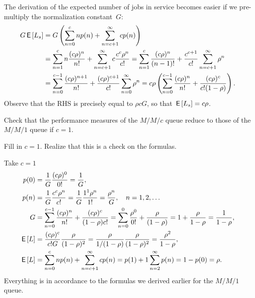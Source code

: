 \documentclass[queueing-book.tex]{subfiles}
\begin{document}
\begin{exercise}
\begin{solution}
The derivation of the expected number of jobs in service becomes easier if we pre-multiply the normalization constant~$G$:
 \begin{align*}
 G \,\mathsf{E}\left[L_s\right]
&= G \left( \sum_{n=0}^{c} n p(n) + \sum_{n=c+1}^{\infty} c p(n) \right) \\
&= \sum_{n=1}^{c} n \frac{(c\rho)^n}{n!} + \sum_{n=c+1}^{\infty} c \frac{c^c\rho^n}{c!}
= \sum_{n=1}^{c} \frac{(c\rho)^n}{(n-1)!} + \frac{c^{c+1}}{c!}\sum_{n=c+1}^{\infty} \rho^n\\
&= \sum_{n=0}^{c-1} \frac{(c\rho)^{n+1}}{n!} + \frac{(c\rho)^{c+1}}{c!}\sum_{n=0}^{\infty} \rho^n
= c\rho \left(\sum_{n=0}^{c-1} \frac{(c\rho)^n}{n!} + \frac{(c\rho)^{c}}{c!(1-\rho)}\right).
 \end{align*}
Observe that the RHS is precisely equal to $\rho c G$, so that $\,\mathsf{E}\left[L_s\right] = c \rho$.
\end{solution}
\end{exercise}






\begin{exercise}
 Check that the performance measures of the $M/M/c$ queue reduce to those of the $M/M/1$ queue if $c=1$.
\begin{hint}
Fill in $c=1$. Realize that this is a check on the formulas.
\end{hint}
\begin{solution}
Take $c=1$
 \begin{align*}
p(0) &= \frac{1}G \frac{(c\rho)^0}{0!}=\frac1 G, \\
p(n) &= \frac{1}G \frac{c^c\rho^n}{c!} = \frac{1}G \frac{1^1\rho^n}{1!} =\frac{\rho^n}G , \quad n=1,2, \ldots \\
G &=\sum_{n=0}^{c-1} \frac{(c\rho)^n}{n!} + \frac{(c\rho)^c}{(1-\rho)c!}
=\sum_{n=0}^{0} \frac{\rho^0}{0!} + \frac{\rho}{(1-\rho)} = 1 + \frac{\rho}{1-\rho} = \frac1{1-\rho},
\\
\,\mathsf{E}\left[L\right] &= \frac{(c\rho)^c}{c! G}\frac{\rho}{(1-\rho)^2} = \frac{\rho}{1/(1-\rho)}\frac{\rho}{(1-\rho)^2} = \frac{\rho^2}{1-\rho}, \\
\,\mathsf{E}\left[L\right] &= \sum_{n=0}^{c}n p(n) + \sum_{n=c+1}^\infty c p(n) = p(1) + 1 \sum_{n=2}^\infty p(n) = 1- p(0) = \rho.
\end{align*}
Everything is in accordance to the formulas we derived earlier for the $M/M/1$ queue.
\end{solution}
\end{exercise}
\end{document}
